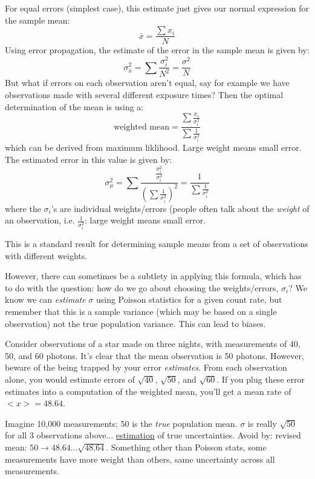 \documentclass[12pt]{article}
\begin{document}
For equal errors (simplest case),
this estimate just gives our normal expression for
the sample mean:
    $$ \bar{x} = \frac{\sum x_i}{N} $$
Using error propagation, the estimate of the error in the sample mean
is given by:
    $$ \sigma_{\bar{x}}^{2} = \sum\frac{\sigma_i^{2}}{N^{2}}
       = \frac{\sigma^{2}}{N}$$
But what if errors on each observation aren't equal, say for example
we have observations made with several different exposure times? Then
the optimal determination of the mean is using a:
    $$ \textrm{weighted\ mean} = \frac{\sum\frac{x_i}{\sigma_i^{2}}}
       {\sum\frac{1}{\sigma_i^{2}}} $$
\textcolor{myBlue}{which can be derived from maximum liklihood.
Large weight means small error}.
The estimated error in this value is given by:
    $$ \sigma_{\mu}^{2} = \sum\frac{\frac{\sigma_i^{2}}{\sigma_i^{4}}}
       {(\sum\frac{1}{\sigma_i^{2}})^{2}}
       = \frac{1}{\sum\frac{1}{\sigma_i^{2}}}$$
where the $\sigma_i$'s are individual weights/errors
(people often talk about the \emph{weight} of an observation, i.e.
$\frac{1}{\sigma_i^{2}}$: large weight means small error.

This is a standard result for determining sample means from a set of
observations with different weights.

However, there can sometimes be a subtlety in applying this formula,
which has to do with the question: how do we go about choosing the
weights/errors, $\sigma_i$? We know we can \emph{estimate} $\sigma$
using Poisson statistics for a given count rate, but remember that
this is a sample variance (which may be based on a single
observation) not the true population variance. This can lead to
biases.

Consider observations of a star made on three nights, with
measurements of 40, 50, and 60 photons. It's clear that the mean
observation is 50 photons. However, beware of the being trapped by
your error \emph{estimates}. From each observation alone, you would estimate
errors of $\sqrt{40}$, $\sqrt{50}$, and $\sqrt{60}$. If you
plug these error estimates into a computation of the weighted mean,
you'll get a mean rate of $<x>=48.64$.

\textcolor{myBlue}{Imagine 10,000 measurements; 50 is the \emph{true}
population mean. $\sigma$ is really $\sqrt{50}$ for all 3 observations
above$\ldots$ \underline{estimation} of true uncertainties.
Avoid by: revised mean: $50 \rightarrow 48.64 \ldots
\sqrt{48.64}$. Something other than Poisson stats, some measurements
have more weight than others, same uncertainty across all
measurements.}
\end{document}
